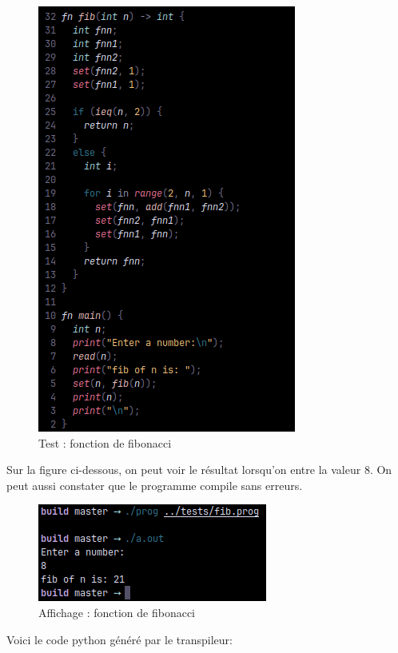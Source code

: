 \documentclass[a4paper]{article}%
\begin{document}
\begin{figure}[h]
  \begin{center}
  \includegraphics[scale=0.7]{./img/fib-prog.png}
  \caption{Test : fonction de fibonacci}
  \end{center}
\end{figure}

Sur la figure ci-dessous, on peut voir le résultat lorsqu'on entre la valeur 8.
On peut aussi constater que le programme compile sans erreurs.

\begin{figure}[h]
  \begin{center}
  \includegraphics[scale=0.7]{./img/fib-prog-out.png}
  \caption{Affichage : fonction de fibonacci}
  \end{center}
\end{figure}

\clearpage
Voici le code python généré par le transpileur:
\end{document}
